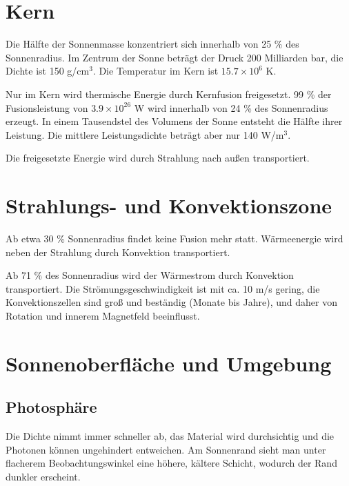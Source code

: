 \documentclass[
  a4paper,
  DIV=11]{scrreprt}
\begin{document}
\hypertarget{kern}{%
\section{Kern}\label{kern}}

Die Hälfte der Sonnenmasse konzentriert sich innerhalb von 25 \% des
Sonnenradius. Im Zentrum der Sonne beträgt der Druck 200 Milliarden bar,
die Dichte ist 150 g/cm\(^3\). Die Temperatur im Kern ist
\(15.7 \times 10^6\) K.

Nur im Kern wird thermische Energie durch Kernfusion freigesetzt. 99 \%
der Fusionsleistung von \(3.9 \times 10^{26}\) W wird innerhalb von 24
\% des Sonnenradius erzeugt. In einem Tausendstel des Volumens der Sonne
entsteht die Hälfte ihrer Leistung. Die mittlere Leistungsdichte beträgt
aber nur 140 W/m\(^3\).

Die freigesetzte Energie wird durch Strahlung nach außen transportiert.

\hypertarget{strahlungs--und-konvektionszone}{%
\section{Strahlungs- und
Konvektionszone}\label{strahlungs--und-konvektionszone}}

Ab etwa 30 \% Sonnenradius findet keine Fusion mehr statt. Wärmeenergie
wird neben der Strahlung durch Konvektion transportiert.

Ab 71 \% des Sonnenradius wird der Wärmestrom durch Konvektion
transportiert. Die Strömungsgeschwindigkeit ist mit ca. 10 m/s gering,
die Konvektionszellen sind groß und beständig (Monate bis Jahre), und
daher von Rotation und innerem Magnetfeld beeinflusst.

\hypertarget{sonnenoberfluxe4che-und-umgebung}{%
\section{Sonnenoberfläche und
Umgebung}\label{sonnenoberfluxe4che-und-umgebung}}

\hypertarget{photosphuxe4re}{%
\subsection{Photosphäre}\label{photosphuxe4re}}

Die Dichte nimmt immer schneller ab, das Material wird durchsichtig und
die Photonen können ungehindert entweichen. Am Sonnenrand sieht man
unter flacherem Beobachtungswinkel eine höhere, kältere Schicht, wodurch
der Rand dunkler erscheint.
\end{document}
